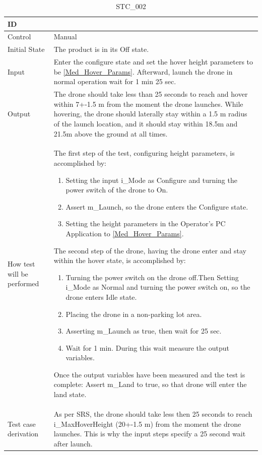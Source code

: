 \documentclass[12pt, titlepage]{article}
\begin{document}
\begin{table}[!h]
\begin{center}
\caption {STC\_002}
\label{tab:STC_002}
\begin{tabular}{ | m{1.5cm} | m{15cm} | } 
\hline
ID & \nameref{tab:STC_002}  \\ 
\hline
Control & Manual\\ 
\hline
Initial State & The product is in its Off state.
 \\ 
\hline
Input & Enter the configure state and set the hover height parameters to be \ref{Med_Hover_Params}. Afterward, launch the drone in normal operation wait for 1 min 25 sec. \\ 
\hline
Output & The drone should take less than 25 seconds to reach and hover within 7+-1.5 m from the moment the drone launches. While hovering, the drone should laterally stay within a 1.5 m radius of the launch location, and it should stay within 18.5m and 21.5m above the ground at all times. 
 \\ 
\hline
How test will be performed &
The first step of the test, configuring height parameters, is accomplished by:
\begin{enumerate}[topsep=0pt,itemsep=-1ex,partopsep=1ex,parsep=1ex]
    \item Setting the input i\_Mode as Configure and turning the power switch of the drone to On.
    \item Assert m\_Launch, so the drone enters the Configure state.
    \item Setting the height parameters in the Operator's PC Application to \ref{Med_Hover_Params}.
\end{enumerate}
The second step of the drone, having the drone enter and stay within the hover state, is accomplished by:
\begin{enumerate}[topsep=0pt,itemsep=-1ex,partopsep=1ex,parsep=1ex]
	\item Turning the power switch on the drone off.Then Setting i\_Mode as Normal and turning the power switch on, so the drone enters  Idle state.
	\item Placing the drone in a non-parking lot area. 
	\item Asserting m\_Launch as true, then wait for 25 sec.
	\item Wait for 1 min. During this wait measure the output variables.
\end{enumerate}
Once the output variables have been measured and the test is complete:
Assert m_Land to true, so that drone will enter the land state.\\ 
\hline
Test case derivation & As per SRS, the drone should take less then 25 seconds to reach i\_MaxHoverHeight (20+-1.5 m) from the moment the drone launches. This is why the input steps specify a 25 second wait after launch.


\end{tabular}
\end{center}
\end{table}
\end{document}
